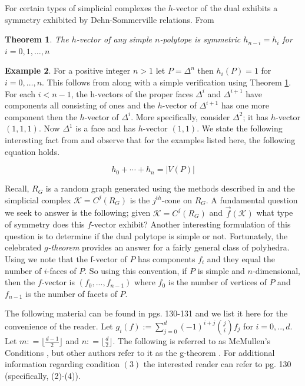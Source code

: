 \documentclass[oneside,12pt]{amsart}
\newtheorem{Theorem}{Theorem}[section]
\theoremstyle{definition}
\newtheorem{Example}[Theorem]{Example}
\numberwithin{equation}{section}
\begin{document}
For certain types of simplicial complexes the $h$-vector of the dual exhibits a symmetry exhibited by Dehn-Sommerville relations.   From \cite{BP1}

\begin{Theorem}\label{Dehn}
The $h$-vector of any simple $n$-polytope is symmetric $h_{n-i} = h_i$ for $i = 0,1,\ldots,n$
\end{Theorem}


\begin{Example}
For a positive integer $n > 1$ let  $P = \Delta^n$ then $h_i(P) = 1$ for $i =0,\ldots,n$.  This follows from \cite{BP1} along with a simple verification using Theorem \ref{Dehn}. For each $i < n-1$, the h-vectors of the proper faces $ \Delta^i$ and $ \Delta^{i+1}$ have components all consisting of ones and the $h$-vector of $ \Delta^{i+1}$ has one more component then the $h$-vector of $ \Delta^i$.  More specifically, consider $\Delta^2$; it has $h$-vector $(1,1,1)$.  Now $\Delta^1$ is a face and has $h$-vector $(1,1)$.  We state the following interesting fact from \cite{DJ} and observe that for the examples listed here, the following equation holds.

$$h_0 + \cdots+ h_n = |V(P)|$$

\end{Example}

Recall, $R_G$ is a random graph generated using the methods described in \cite{ALDH} and the simplicial complex $\mathcal{K} = C^j(R_G)$ is the $j^{th}$-cone on $R_G$. A fundamental question we seek to answer is the following; given $\mathcal{K} = C^j(R_G)$ and $\overrightarrow{f}(\mathcal{K})$ what type of symmetry does this $f$-vector exhibit? Another interesting formulation of this question is to determine if the dual polytope is simple or not.  Fortunately, the celebrated \textit{$g$-theorem} provides an answer for a fairly general class of polyhedra. Using \cite{B} we note that the f-vector of $P$ has components $f_i$ and they equal the number of $i$-faces of $P$.  So using this convention, if $P$ is simple and $n$-dimensional, then the $f$-vector is $(f_0,...,f_{n-1})$ where $f_0$ is the number of vertices of $P$ and $f_{n-1}$ is the number of facets of $P$.

The following material can be found in \cite{B} pgs. 130-131 and we list it here for the convenience of the reader.  Let $g_i(f) := \sum_{j=0}^d (-1)^{i+j}\binom{j}{i}f_j$ for $i = 0,..,d$.  Let $m: = \lfloor \frac{d-1}{2}\rfloor$ and $n: = \lfloor \frac{d}{2} \rfloor$.  The following is referred to as McMullen's Conditions \cite{B}, but other authors refer to it as the g-theorem \cite{BP1}.  For additional information regarding condition $(3)$ the interested reader can refer to \cite{B} pg. 130 (specifically, (2)-(4)).
\end{document}

